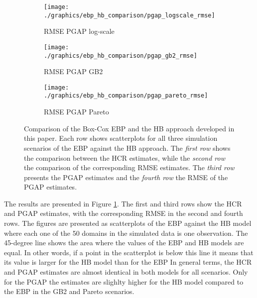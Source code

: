 \begin{figure}
    \begin{subfigure}{0.31\linewidth}
        \centering
        \texttt{[image: ./graphics/ebp\_hb\_comparison/pgap\_logscale\_rmse]}
        \caption{RMSE PGAP log-scale}
    \end{subfigure}
    \begin{subfigure}{0.31\linewidth}
        \centering
        \texttt{[image: ./graphics/ebp\_hb\_comparison/pgap\_gb2\_rmse]}
        \caption{RMSE PGAP GB2}
    \end{subfigure}
    \begin{subfigure}{0.31\linewidth}
        \centering
        \texttt{[image: ./graphics/ebp\_hb\_comparison/pgap\_pareto\_rmse]}
        \caption{RMSE PGAP Pareto}
    \end{subfigure}
    \caption[Comparison of EBP and HB approaches with simulated data.]{Comparison of the Box-Cox EBP and the HB approach developed in this paper. Each row shows scatterplots for all three simulation scenarios of the EBP against the HB approach. The \textit{first row} shows the comparison between the HCR estimates, while the \textit{second row} the comparison of the corresponding RMSE estimates. The \textit{third row} presents the PGAP estimates and the \textit{fourth row} the RMSE of the PGAP estimates.}
    \label{fig:ebp_hb_comparison}
\end{figure}

The results are presented in Figure \ref{fig:ebp_hb_comparison}.
The first and third rows show the HCR and PGAP estimates, with the corresponding RMSE in the second and fourth rows.
The figures are presented as scatterplots of the EBP against the HB model where each one of the 50 domains in the simulated data is one observation.
The 45-degree line shows the area where the values of the EBP and HB models are equal.
In other words, if a point in the scatterplot is below this line it means that its value is larger for the HB model than for the EBP
In general terms, the HCR and PGAP estimates are almost identical in both models for all scenarios.
Only for the PGAP the estimates are slighlty higher for the HB model compared to the EBP in the GB2 and Pareto scenarios.


